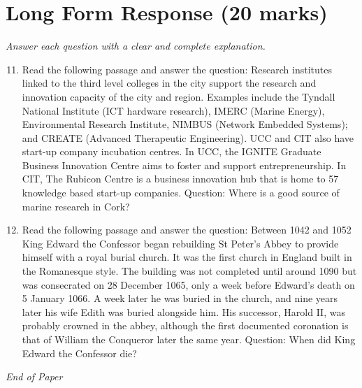 \documentclass[12pt]{article}
\begin{document}
\section*{Long Form Response (20 marks)}
\textit{Answer each question with a clear and complete explanation.}
\begin{enumerate}[label=\arabic*.]
\setcounter{enumi}{10}
\item Read the following passage and answer the question: Research institutes linked to the third level colleges in the city support the research and innovation capacity of the city and region. Examples include the Tyndall National Institute (ICT hardware research), IMERC (Marine Energy), Environmental Research Institute, NIMBUS (Network Embedded Systems); and CREATE (Advanced Therapeutic Engineering). UCC and CIT also have start-up company incubation centres. In UCC, the IGNITE Graduate Business Innovation Centre aims to foster and support entrepreneurship. In CIT, The Rubicon Centre is a business innovation hub that is home to 57 knowledge based start-up companies. Question: Where is a good source of marine research in Cork?
\item Read the following passage and answer the question: Between 1042 and 1052 King Edward the Confessor began rebuilding St Peter's Abbey to provide himself with a royal burial church. It was the first church in England built in the Romanesque style. The building was not completed until around 1090 but was consecrated on 28 December 1065, only a week before Edward's death on 5 January 1066. A week later he was buried in the church, and nine years later his wife Edith was buried alongside him. His successor, Harold II, was probably crowned in the abbey, although the first documented coronation is that of William the Conqueror later the same year. Question: When did King Edward the Confessor die?
\end{enumerate}

\vfill
\noindent\textit{End of Paper}
\end{document}
